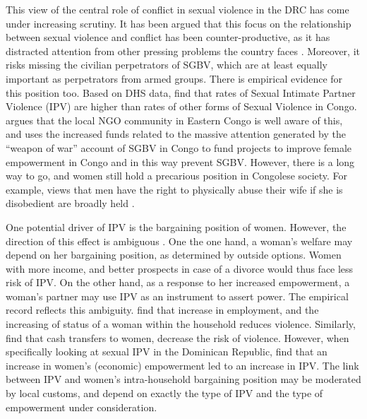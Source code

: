 \documentclass[10pt,a4paper]{scrartcl} %
\begin{document}
This view of the central role of conflict in sexual violence in the DRC has come under increasing scrutiny. It has been argued that this focus on the relationship between sexual violence and conflict has been counter-productive, as it has distracted attention from other pressing problems the country faces \citep{Autesserre2012a, Hilhorst2018,Porter2019}. Moreover, it risks missing the civilian perpetrators of SGBV, which are at least equally important as perpetrators from armed groups. There is empirical evidence for this position too. Based on DHS data, \cite{Peterman2011} find that rates of Sexual Intimate Partner Violence (IPV) are higher than rates of other forms of Sexual Violence in Congo. \cite{Hilhorst2018} argues that the local NGO community in Eastern Congo is well aware of this, and uses the increased funds related to the massive attention generated by the ``weapon of war'' account of SGBV in Congo to fund projects to improve female empowerment in Congo and in this way prevent SGBV.  However, there is a long way to go, and women still hold a precarious position in Congolese society. For example, views that men have the right to physically abuse their wife if she is disobedient are broadly held \citep{Quattrochi2019}.

One potential driver of IPV is the bargaining position of women. However, the direction of this effect is ambiguous \citep{Eswaran2011}. One the one hand, a woman's welfare may depend on her bargaining position, as determined by outside options. Women with more income, and better prospects in case of a divorce would thus face less risk of IPV. On the other hand, as a response to her increased empowerment, a  woman's partner may use IPV as an instrument to assert power. The empirical record reflects this ambiguity. \cite{Bhattacharya} find that increase in employment, and the increasing of status of a woman within the household reduces violence. Similarly, \cite{Hidrobo2016} find that cash transfers to women, decrease the risk of violence. However, when specifically looking at sexual IPV in the Dominican Republic, \cite{Bueno2017} find that an increase in women's (economic) empowerment led to an increase in IPV. The link between IPV and women's intra-household bargaining position may be moderated by local customs, and depend on exactly the type of IPV and the type of empowerment under consideration.
\end{document}
